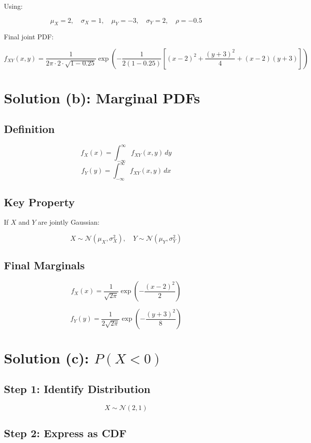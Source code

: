 \documentclass[11pt]{article}
\begin{document}
Using:

\[
\mu_X = 2,\quad \sigma_X = 1,\quad
\mu_Y = -3,\quad \sigma_Y = 2,\quad
\rho = -0.5
\]

Final joint PDF:

\[
f_{XY}(x,y) =
\frac{1}{2\pi \cdot 2 \cdot \sqrt{1-0.25}}
\exp\left(
-\frac{1}{2(1-0.25)}
\left[
(x-2)^2
+
\frac{(y+3)^2}{4}
+
(x-2)(y+3)
\right]
\right)
\]

\section{Solution (b): Marginal PDFs}

\subsection*{Definition}

\[
f_X(x) = \int_{-\infty}^{\infty} f_{XY}(x,y)\,dy
\]
\[
f_Y(y) = \int_{-\infty}^{\infty} f_{XY}(x,y)\,dx
\]

\subsection*{Key Property}

If $X$ and $Y$ are jointly Gaussian:

\[
X \sim \mathcal{N}(\mu_X, \sigma_X^2), \quad
Y \sim \mathcal{N}(\mu_Y, \sigma_Y^2)
\]

\subsection*{Final Marginals}

\[
f_X(x) =
\frac{1}{\sqrt{2\pi}}
\exp\left(-\frac{(x-2)^2}{2}\right)
\]

\[
f_Y(y) =
\frac{1}{2\sqrt{2\pi}}
\exp\left(-\frac{(y+3)^2}{8}\right)
\]

\section{Solution (c): $P(X < 0)$}

\subsection*{Step 1: Identify Distribution}

\[
X \sim \mathcal{N}(2,1)
\]

\subsection*{Step 2: Express as CDF}
\end{document}
